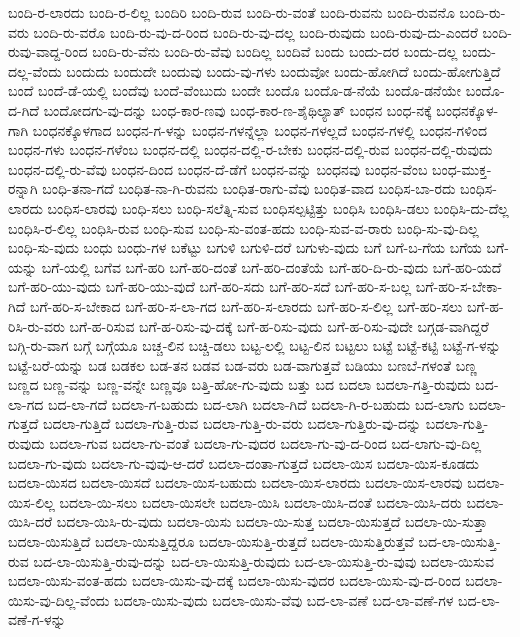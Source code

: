 {ಬಂದಿ-ರ-ಲಾರದು
ಬಂದಿ-ರ-ಲಿಲ್ಲ
ಬಂದಿರಿ
ಬಂದಿ-ರುವ
ಬಂದಿ-ರು-ವಂತೆ
ಬಂದಿ-ರುವನು
ಬಂದಿ-ರುವನೊ
ಬಂದಿ-ರು-ವರು
ಬಂದಿ-ರು-ವರೊ
ಬಂದಿ-ರು-ವು-ದ-ರಿಂದ
ಬಂದಿ-ರು-ವು-ದಲ್ಲ
ಬಂದಿ-ರುವುದು
ಬಂದಿ-ರುವು-ದು-ಎಂದರೆ
ಬಂದಿ-ರುವು-ವಾದ್ದ-ರಿಂದ
ಬಂದಿ-ರು-ವೆನು
ಬಂದಿ-ರು-ವೆವು
ಬಂದಿಲ್ಲ
ಬಂದಿವೆ
ಬಂದು
ಬಂದು-ದರ
ಬಂದು-ದಲ್ಲ
ಬಂದು-ದಲ್ಲ-ವೆಂದು
ಬಂದುದು
ಬಂದುದೇ
ಬಂದುವು
ಬಂದು-ವು-ಗಳು
ಬಂದುವೋ
ಬಂದು-ಹೋಗಿದೆ
ಬಂದು-ಹೋಗುತ್ತಿದೆ
ಬಂದೆ
ಬಂದೆ-ಡೆ-ಯಲ್ಲಿ
ಬಂದೆವು
ಬಂದೆ-ವೆಂಬುದು
ಬಂದೇ
ಬಂದೊ
ಬಂದೊ-ಡ-ನೆಯೆ
ಬಂದೊ-ಡನೆಯೇ
ಬಂದೊ-ದ-ಗಿದೆ
ಬಂದೋದಗು-ವು-ದನ್ನು
ಬಂಧ-ಕಾರ-ಣವು
ಬಂಧ-ಕಾರ-ಣ-ಶೈಥಿಲ್ಯಾತ್
ಬಂಧನ
ಬಂಧ-ನಕ್ಕೆ
ಬಂಧನಕ್ಕೊಳ-ಗಾಗಿ
ಬಂಧನಕ್ಕೊಳಗಾದ
ಬಂಧನ-ಗ-ಳನ್ನು
ಬಂಧನ-ಗಳನ್ನೆಲ್ಲಾ
ಬಂಧನ-ಗಳಲ್ಲದೆ
ಬಂಧನ-ಗಳಲ್ಲಿ
ಬಂಧನ-ಗಳಿಂದ
ಬಂಧನ-ಗಳು
ಬಂಧನ-ಗಳೆಂಬ
ಬಂಧನ-ದಲ್ಲಿ
ಬಂಧನ-ದಲ್ಲಿ-ರ-ಬೇಕು
ಬಂಧನ-ದಲ್ಲಿ-ರುವ
ಬಂಧನ-ದಲ್ಲಿ-ರುವುದು
ಬಂಧನ-ದಲ್ಲಿ-ರು-ವೆವು
ಬಂಧನ-ದಿಂದ
ಬಂಧನ-ದೆ-ಡೆಗೆ
ಬಂಧನ-ವನ್ನು
ಬಂಧನವು
ಬಂಧನ-ವೆಂಬ
ಬಂಧ-ಮುಕ್ತ-ರನ್ನಾಗಿ
ಬಂಧಿ-ತನಾ-ಗದೆ
ಬಂಧಿತ-ನಾ-ಗಿ-ರುವನು
ಬಂಧಿತ-ರಾಗು-ವೆವು
ಬಂಧಿತ-ವಾದ
ಬಂಧಿಸ-ಬಾ-ರದು
ಬಂಧಿಸ-ಲಾರದು
ಬಂಧಿಸ-ಲಾರವು
ಬಂಧಿ-ಸಲು
ಬಂಧಿ-ಸಲೆತ್ನಿ-ಸುವ
ಬಂಧಿಸಲ್ಪಟ್ಟಿತ್ತು
ಬಂಧಿಸಿ
ಬಂಧಿಸಿ-ಡಲು
ಬಂಧಿಸಿ-ದು-ದೆಲ್ಲ
ಬಂಧಿಸಿ-ರ-ಲಿಲ್ಲ
ಬಂಧಿಸಿ-ರುವ
ಬಂಧಿ-ಸುವ
ಬಂಧಿ-ಸು-ವಂತ-ಹದು
ಬಂಧಿ-ಸುವ-ವ-ರಾರು
ಬಂಧಿ-ಸು-ವು-ದಿಲ್ಲ
ಬಂಧಿ-ಸು-ವುದು
ಬಂಧು
ಬಂಧು-ಗಳ
ಬಕೆಟ್ಟು
ಬಗುಳಿ
ಬಗುಳಿ-ದರೆ
ಬಗುಳು-ವುದು
ಬಗೆ
ಬಗೆ-ಬ-ಗೆಯ
ಬಗೆಯ
ಬಗೆ-ಯನ್ನು
ಬಗೆ-ಯಲ್ಲಿ
ಬಗೆವ
ಬಗೆ-ಹರಿ
ಬಗೆ-ಹರಿ-ದಂತೆ
ಬಗೆ-ಹರಿ-ದಂತೆಯೆ
ಬಗೆ-ಹರಿ-ದಿ-ರು-ವುದು
ಬಗೆ-ಹರಿ-ಯದೆ
ಬಗೆ-ಹರಿ-ಯು-ವುದು
ಬಗೆ-ಹರಿ-ಯು-ವುದೆ
ಬಗೆ-ಹರಿ-ಸದು
ಬಗೆ-ಹರಿ-ಸದೆ
ಬಗೆ-ಹರಿ-ಸ-ಬಲ್ಲ
ಬಗೆ-ಹರಿ-ಸ-ಬೇಕಾ-ಗಿದೆ
ಬಗೆ-ಹರಿ-ಸ-ಬೇಕಾದ
ಬಗೆ-ಹರಿ-ಸ-ಲಾ-ಗದ
ಬಗೆ-ಹರಿ-ಸ-ಲಾರದು
ಬಗೆ-ಹರಿ-ಸ-ಲಿಲ್ಲ
ಬಗೆ-ಹರಿ-ಸಲು
ಬಗೆ-ಹ-ರಿಸಿ-ರು-ವರು
ಬಗೆ-ಹ-ರಿಸುವ
ಬಗೆ-ಹ-ರಿಸು-ವು-ದಕ್ಕೆ
ಬಗೆ-ಹ-ರಿಸು-ವುದು
ಬಗೆ-ಹ-ರಿಸು-ವುದೇ
ಬಗ್ಗಡ-ವಾಗಿದ್ದರೆ
ಬಗ್ಗಿ-ರು-ವಾಗ
ಬಗ್ಗೆ
ಬಗ್ಗೆಯೂ
ಬಚ್ಚ-ಲಿನ
ಬಚ್ಚಿ-ಡಲು
ಬಟ್ಟ-ಲಲ್ಲಿ
ಬಟ್ಟ-ಲಿನ
ಬಟ್ಟಲು
ಬಟ್ಟೆ
ಬಟ್ಟೆ-ಕಟ್ಟಿ
ಬಟ್ಟೆ-ಗ-ಳನ್ನು
ಬಟ್ಟೆ-ಬರೆ-ಯನ್ನು
ಬಡ
ಬಡಕಲ
ಬಡ-ತನ
ಬಡವ
ಬಡ-ವರು
ಬಡ-ವಾಗುತ್ತವೆ
ಬಡಿಯು
ಬಣಬೆ-ಗಳಂತೆ
ಬಣ್ಣ
ಬಣ್ಣದ
ಬಣ್ಣ-ವನ್ನು
ಬಣ್ಣ-ವನ್ನೇ
ಬಣ್ಣವೂ
ಬತ್ತಿ-ಹೋ-ಗು-ವುದು
ಬತ್ತು
ಬದ
ಬದಲಾ
ಬದಲಾ-ಗತ್ತಿ-ರುವುದು
ಬದ-ಲಾ-ಗದ
ಬದ-ಲಾ-ಗದೆ
ಬದಲಾ-ಗ-ಬಹುದು
ಬದ-ಲಾಗಿ
ಬದಲಾ-ಗಿದೆ
ಬದಲಾ-ಗಿ-ರ-ಬಹುದು
ಬದ-ಲಾಗು
ಬದಲಾ-ಗುತ್ತದೆ
ಬದಲಾ-ಗುತ್ತಿದೆ
ಬದಲಾ-ಗುತ್ತಿ-ರುವ
ಬದಲಾ-ಗುತ್ತಿ-ರು-ವರು
ಬದಲಾ-ಗುತ್ತಿರು-ವು-ದನ್ನು
ಬದಲಾ-ಗುತ್ತಿ-ರುವುದು
ಬದಲಾ-ಗುವ
ಬದಲಾ-ಗು-ವಂತೆ
ಬದಲಾ-ಗು-ವುದರ
ಬದಲಾ-ಗು-ವು-ದ-ರಿಂದ
ಬದ-ಲಾಗು-ವು-ದಿಲ್ಲ
ಬದಲಾ-ಗು-ವುದು
ಬದಲಾ-ಗು-ವುವು-ಆ-ದರೆ
ಬದಲಾ-ದಂತಾ-ಗುತ್ತದೆ
ಬದಲಾ-ಯಿಸ
ಬದಲಾ-ಯಿಸ-ಕೂಡದು
ಬದಲಾ-ಯಿಸದ
ಬದಲಾ-ಯಿಸದೆ
ಬದಲಾ-ಯಿಸ-ಬಹುದು
ಬದಲಾ-ಯಿಸ-ಲಾರದು
ಬದಲಾ-ಯಿಸ-ಲಾರವು
ಬದಲಾ-ಯಿಸ-ಲಿಲ್ಲ
ಬದಲಾ-ಯಿ-ಸಲು
ಬದಲಾ-ಯಿಸಲೇ
ಬದಲಾ-ಯಿಸಿ
ಬದಲಾ-ಯಿಸಿ-ದಂತೆ
ಬದಲಾ-ಯಿಸಿ-ದರು
ಬದಲಾ-ಯಿಸಿ-ದರೆ
ಬದಲಾ-ಯಿಸಿ-ರು-ವುದು
ಬದಲಾ-ಯಿಸು
ಬದಲಾ-ಯಿ-ಸುತ್ತ
ಬದಲಾ-ಯಿಸುತ್ತದೆ
ಬದಲಾ-ಯಿ-ಸುತ್ತಾ
ಬದಲಾ-ಯಿಸುತ್ತಿದೆ
ಬದಲಾ-ಯಿಸುತ್ತಿದ್ದರೂ
ಬದಲಾ-ಯಿಸುತ್ತಿ-ರುತ್ತದೆ
ಬದಲಾ-ಯಿಸುತ್ತಿರುತ್ತವೆ
ಬದ-ಲಾ-ಯಿಸುತ್ತಿ-ರುವ
ಬದ-ಲಾ-ಯಿಸುತ್ತಿ-ರುವು-ದನ್ನು
ಬದ-ಲಾ-ಯಿಸುತ್ತಿ-ರುವುದು
ಬದ-ಲಾ-ಯಿಸುತ್ತಿ-ರು-ವುವು
ಬದಲಾ-ಯಿಸುವ
ಬದಲಾ-ಯಿಸು-ವಂತ-ಹದು
ಬದಲಾ-ಯಿಸು-ವು-ದಕ್ಕೆ
ಬದಲಾ-ಯಿಸು-ವುದರ
ಬದಲಾ-ಯಿಸು-ವು-ದ-ರಿಂದ
ಬದಲಾ-ಯಿಸು-ವು-ದಿಲ್ಲ-ವೆಂದು
ಬದಲಾ-ಯಿಸು-ವುದು
ಬದಲಾ-ಯಿಸು-ವೆವು
ಬದ-ಲಾ-ವಣೆ
ಬದ-ಲಾ-ವಣೆ-ಗಳ
ಬದ-ಲಾ-ವಣೆ-ಗ-ಳನ್ನು
}
